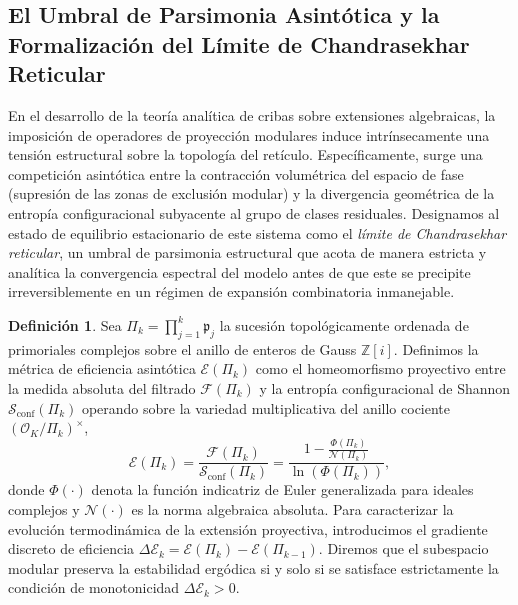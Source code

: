 \documentclass{article}
\numberwithin{equation}{section}
\theoremstyle{plain}
\theoremstyle{definition}
\newtheorem{definicion}[teorema]{Definición}
\begin{document}
\subsection{El Umbral de Parsimonia Asintótica y la Formalización del Límite de Chandrasekhar Reticular}

En el desarrollo de la teoría analítica de cribas sobre extensiones algebraicas, la imposición de operadores de proyección modulares induce intrínsecamente una tensión estructural sobre la topología del retículo. Específicamente, surge una competición asintótica entre la contracción volumétrica del espacio de fase (supresión de las zonas de exclusión modular) y la divergencia geométrica de la entropía configuracional subyacente al grupo de clases residuales.
Designamos al estado de equilibrio estacionario de este sistema como el \textit{límite de Chandrasekhar reticular}, un umbral de parsimonia estructural que acota de manera estricta y analítica la convergencia espectral del modelo antes de que este se precipite irreversiblemente en un régimen de expansión combinatoria inmanejable.

\begin{definicion}
Sea $\Pi_k = \prod_{j=1}^k \mathfrak{p}_j$ la sucesión topológicamente ordenada de primoriales complejos sobre el anillo de enteros de Gauss $\mathbb{Z}[i]$. Definimos la métrica de eficiencia asintótica $\mathcal{E}(\Pi_k)$ como el homeomorfismo proyectivo entre la medida absoluta del filtrado $\mathcal{F}(\Pi_k)$ y la entropía configuracional de Shannon $\mathcal{S}_{\mathrm{conf}}(\Pi_k)$ operando sobre la variedad multiplicativa del anillo cociente $(\mathcal{O}_K/\Pi_k)^\times$,
\begin{equation}
    \mathcal{E}(\Pi_k) = \frac{\mathcal{F}(\Pi_k)}{\mathcal{S}_{\mathrm{conf}}(\Pi_k)} = \frac{1 - \frac{\Phi(\Pi_k)}{\mathcal{N}(\Pi_k)}}{\ln(\Phi(\Pi_k))},
\end{equation}
donde $\Phi(\cdot)$ denota la función indicatriz de Euler generalizada para ideales complejos y $\mathcal{N}(\cdot)$ es la norma algebraica absoluta. 
Para caracterizar la evolución termodinámica de la extensión proyectiva, introducimos el gradiente discreto de eficiencia $\Delta \mathcal{E}_k = \mathcal{E}(\Pi_{k}) - \mathcal{E}(\Pi_{k-1})$. Diremos que el subespacio modular preserva la estabilidad ergódica si y solo si se satisface estrictamente la condición de monotonicidad $\Delta \mathcal{E}_k > 0$.
\end{definicion}
\end{document}
